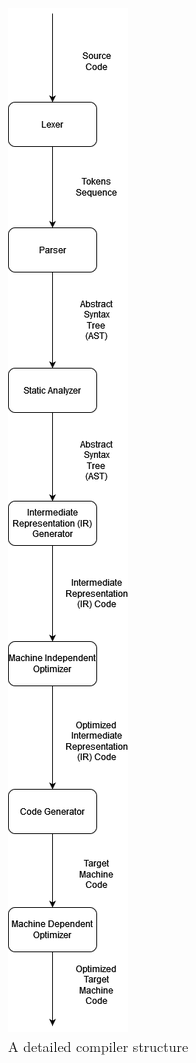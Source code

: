 \begin{figure}[H]  
  \centering
  \includegraphics[width=\textwidth, height=0.8\textheight, keepaspectratio]{Figures/Arquiteturas/CompilersDetailedPipeline.png}  
  \caption{A detailed compiler structure}
  \label{fig:comp}
\end{figure}

